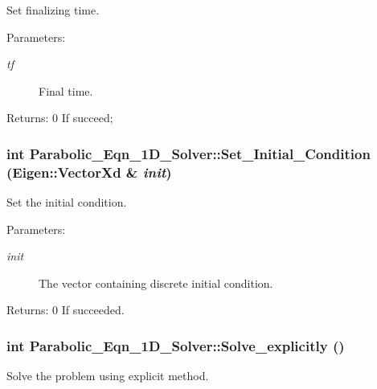 Set finalizing time. \begin{Desc}
\item[Parameters:]
\begin{description}
\item[{\em tf}]Final time. \end{description}
\end{Desc}
\begin{Desc}
\item[Returns:]0 If succeed; \end{Desc}
\subsubsection{\setlength{\rightskip}{0pt plus 5cm}int Parabolic\_\-Eqn\_\-1D\_\-Solver::Set\_\-Initial\_\-Condition (Eigen::Vector\-Xd \& {\em init})}\label{classParabolic__Eqn__1D__Solver_bd6d4a3162e73f10a224eaa56cf14adb}


Set the initial condition. \begin{Desc}
\item[Parameters:]
\begin{description}
\item[{\em init}]The vector containing discrete initial condition. \end{description}
\end{Desc}
\begin{Desc}
\item[Returns:]0 If succeeded. \end{Desc}
\subsubsection{\setlength{\rightskip}{0pt plus 5cm}int Parabolic\_\-Eqn\_\-1D\_\-Solver::Solve\_\-explicitly ()}\label{classParabolic__Eqn__1D__Solver_18ab53cf3ce51e61f2847463131ccc11}


Solve the problem using explicit method. 
